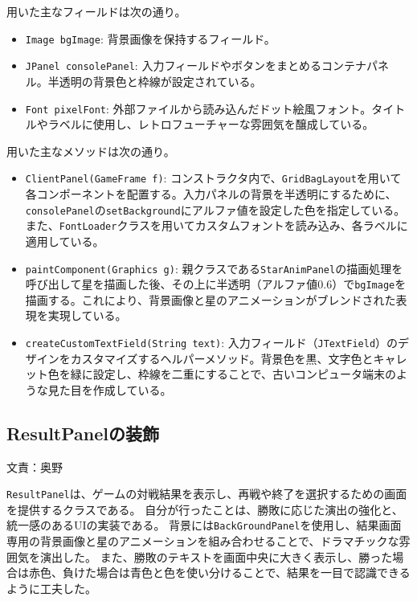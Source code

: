 \documentclass[11pt,a4j]{jarticle}
\begin{document}
用いた主なフィールドは次の通り。
\begin{itemize}
    \item \texttt{Image bgImage}: 背景画像を保持するフィールド。
    \item \texttt{JPanel consolePanel}: 入力フィールドやボタンをまとめるコンテナパネル。半透明の背景色と枠線が設定されている。
    \item \texttt{Font pixelFont}: 外部ファイルから読み込んだドット絵風フォント。タイトルやラベルに使用し、レトロフューチャーな雰囲気を醸成している。
\end{itemize}

用いた主なメソッドは次の通り。
\begin{itemize}
    \item \texttt{ClientPanel(GameFrame f)}: コンストラクタ内で、\texttt{GridBagLayout}を用いて各コンポーネントを配置する。入力パネルの背景を半透明にするために、\texttt{consolePanel}の\texttt{setBackground}にアルファ値を設定した色を指定している。また、\texttt{FontLoader}クラスを用いてカスタムフォントを読み込み、各ラベルに適用している。
    \item \texttt{paintComponent(Graphics g)}: 親クラスである\texttt{StarAnimPanel}の描画処理を呼び出して星を描画した後、その上に半透明（アルファ値0.6）で\texttt{bgImage}を描画する。これにより、背景画像と星のアニメーションがブレンドされた表現を実現している。
    \item \texttt{createCustomTextField(String text)}: 入力フィールド（\texttt{JTextField}）のデザインをカスタマイズするヘルパーメソッド。背景色を黒、文字色とキャレット色を緑に設定し、枠線を二重にすることで、古いコンピュータ端末のような見た目を作成している。
\end{itemize}

\subsection{ResultPanelの装飾}
\begin{flushright}
  文責：奥野
\end{flushright}
\noindent \texttt{ResultPanel}は、ゲームの対戦結果を表示し、再戦や終了を選択するための画面を提供するクラスである。
自分が行ったことは、勝敗に応じた演出の強化と、統一感のあるUIの実装である。
背景には\texttt{BackGroundPanel}を使用し、結果画面専用の背景画像と星のアニメーションを組み合わせることで、ドラマチックな雰囲気を演出した。
また、勝敗のテキストを画面中央に大きく表示し、勝った場合は赤色、負けた場合は青色と色を使い分けることで、結果を一目で認識できるように工夫した。
\end{document}
